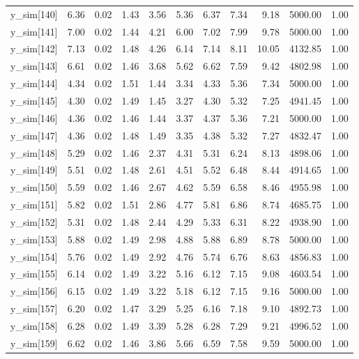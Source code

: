 \begin{table}[ht]
\begin{tabular}{rrrrrrrrrrr}
  y\_sim[140] & 6.36 & 0.02 & 1.43 & 3.56 & 5.36 & 6.37 & 7.34 & 9.18 & 5000.00 & 1.00 \\ 
  y\_sim[141] & 7.00 & 0.02 & 1.44 & 4.21 & 6.00 & 7.02 & 7.99 & 9.78 & 5000.00 & 1.00 \\ 
  y\_sim[142] & 7.13 & 0.02 & 1.48 & 4.26 & 6.14 & 7.14 & 8.11 & 10.05 & 4132.85 & 1.00 \\ 
  y\_sim[143] & 6.61 & 0.02 & 1.46 & 3.68 & 5.62 & 6.62 & 7.59 & 9.42 & 4802.98 & 1.00 \\ 
  y\_sim[144] & 4.34 & 0.02 & 1.51 & 1.44 & 3.34 & 4.33 & 5.36 & 7.34 & 5000.00 & 1.00 \\ 
  y\_sim[145] & 4.30 & 0.02 & 1.49 & 1.45 & 3.27 & 4.30 & 5.32 & 7.25 & 4941.45 & 1.00 \\ 
  y\_sim[146] & 4.36 & 0.02 & 1.46 & 1.44 & 3.37 & 4.37 & 5.36 & 7.21 & 5000.00 & 1.00 \\ 
  y\_sim[147] & 4.36 & 0.02 & 1.48 & 1.49 & 3.35 & 4.38 & 5.32 & 7.27 & 4832.47 & 1.00 \\ 
  y\_sim[148] & 5.29 & 0.02 & 1.46 & 2.37 & 4.31 & 5.31 & 6.24 & 8.13 & 4898.06 & 1.00 \\ 
  y\_sim[149] & 5.51 & 0.02 & 1.48 & 2.61 & 4.51 & 5.52 & 6.48 & 8.44 & 4914.65 & 1.00 \\ 
  y\_sim[150] & 5.59 & 0.02 & 1.46 & 2.67 & 4.62 & 5.59 & 6.58 & 8.46 & 4955.98 & 1.00 \\ 
  y\_sim[151] & 5.82 & 0.02 & 1.51 & 2.86 & 4.77 & 5.81 & 6.86 & 8.74 & 4685.75 & 1.00 \\ 
  y\_sim[152] & 5.31 & 0.02 & 1.48 & 2.44 & 4.29 & 5.33 & 6.31 & 8.22 & 4938.90 & 1.00 \\ 
  y\_sim[153] & 5.88 & 0.02 & 1.49 & 2.98 & 4.88 & 5.88 & 6.89 & 8.78 & 5000.00 & 1.00 \\ 
  y\_sim[154] & 5.76 & 0.02 & 1.49 & 2.92 & 4.76 & 5.74 & 6.76 & 8.63 & 4856.83 & 1.00 \\ 
  y\_sim[155] & 6.14 & 0.02 & 1.49 & 3.22 & 5.16 & 6.12 & 7.15 & 9.08 & 4603.54 & 1.00 \\ 
  y\_sim[156] & 6.15 & 0.02 & 1.49 & 3.22 & 5.18 & 6.12 & 7.15 & 9.16 & 5000.00 & 1.00 \\ 
  y\_sim[157] & 6.20 & 0.02 & 1.47 & 3.29 & 5.25 & 6.16 & 7.18 & 9.10 & 4892.73 & 1.00 \\ 
  y\_sim[158] & 6.28 & 0.02 & 1.49 & 3.39 & 5.28 & 6.28 & 7.29 & 9.21 & 4996.52 & 1.00 \\ 
  y\_sim[159] & 6.62 & 0.02 & 1.46 & 3.86 & 5.66 & 6.59 & 7.58 & 9.59 & 5000.00 & 1.00 \\ 

\end{tabular}
\end{table}
